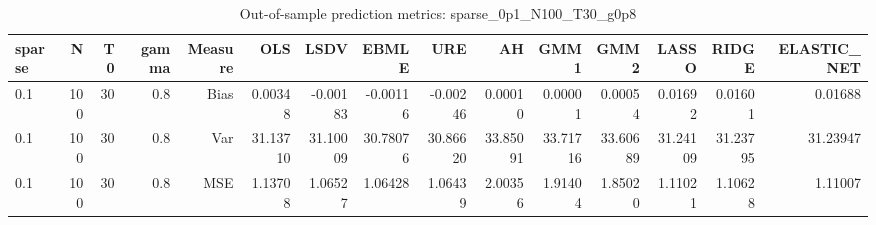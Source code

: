 \begin{table}[!htbp]\centering
\caption{Out-of-sample prediction metrics: sparse_0p1_N100_T30_g0p8}
\label{tab:table3_sparse_0p1_N100_T30_g0p8}
\begin{tabular}{lrrrrrrrrrrrrrr}
\hline
sparse & N & T0 & gamma & Measure & OLS & LSDV & EBMLE & URE & AH & GMM1 & GMM2 & LASSO & RIDGE & ELASTIC_NET \\
\hline
0.1 & 100 & 30 & 0.8 & Bias & 0.00348 & -0.00183 & -0.00116 & -0.00246 & 0.00010 & 0.00001 & 0.00054 & 0.01692 & 0.01601 & 0.01688 \\
0.1 & 100 & 30 & 0.8 & Var & 31.13710 & 31.10009 & 30.78076 & 30.86620 & 33.85091 & 33.71716 & 33.60689 & 31.24109 & 31.23795 & 31.23947 \\
0.1 & 100 & 30 & 0.8 & MSE & 1.13708 & 1.06527 & 1.06428 & 1.06439 & 2.00356 & 1.91404 & 1.85020 & 1.11021 & 1.10628 & 1.11007 \\
\hline
\end{tabular}
\end{table}

